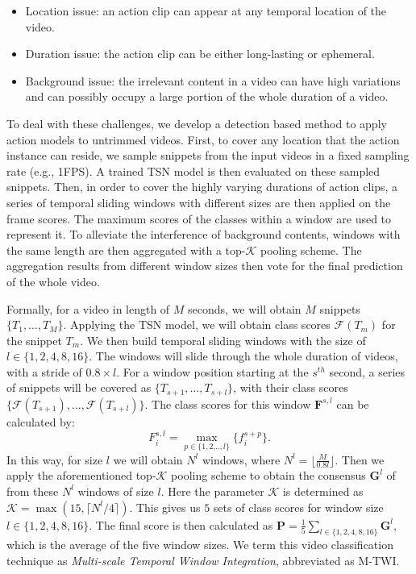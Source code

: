 \documentclass[10pt,journal,compsoc]{IEEEtran}
\begin{document}
\begin{itemize}
	\item Location issue: an action clip can appear at any temporal location of the video.
	\item Duration issue: the action clip can be either long-lasting or ephemeral.
	\item Background issue: the irrelevant content in a video can have high variations and can possibly occupy a large portion of the whole duration of a video.
\end{itemize}

To deal with these challenges, we develop a detection based method to apply action models to untrimmed videos. First, to cover any location that the action instance can reside, we sample snippets from the input videos in a fixed sampling rate (e.g., 1FPS).
A trained TSN model is then evaluated on these sampled snippets. 
Then, in order to cover the highly varying durations of action clips, a series of temporal sliding windows with different sizes are then applied on the frame scores.
The maximum scores of the classes within a window are used to represent it. 
To alleviate the interference of background contents, windows with the same length are then aggregated with a top-$ \mathcal{K} $ pooling scheme.
The aggregation results from different window sizes then vote for the final prediction of the whole video.

Formally, for a video in length of $ M $ seconds, we will obtain $ M $ snippets $ \{T_1, \ldots, T_M\} $. Applying the TSN model, we will obtain class scores $ \mathcal{F}(T_m) $ for the snippet $ T_m $.
We then build temporal sliding windows with the size of $ l \in \{1, 2, 4, 8, 16\} $. 
The windows will slide through the whole duration of videos, with a stride of $ 0.8 \times l $.
For a window position starting at the $s^{th}$ second, a series of snippets will be covered as $ \{T_{s+1}, \ldots, T_{s+l}\} $, with their class scores $ \{ \mathcal{F}(T_{s+1}), \ldots, \mathcal{F}(T_{s+l}) \}$.
The class scores for this window $ \mathbf{F}^{s,l} $ can be calculated by: 
\begin{equation}
	F^{s,l}_{i} = \max_{p \in \{1, 2 \ldots, l\}}\{f_i^{s+p}\}.
\end{equation}
In this way, for size $ l $ we will obtain $ N^l $ windows, where $ N^l = \lfloor\frac{M}{0.8l}\rfloor $.
Then we apply the aforementioned top-$ \mathcal{K} $ pooling scheme to obtain the consensus $ \mathbf{G}^l $ of from these $N^l$ windows of size $ l $.
Here the parameter $ \mathcal{K} $ is determined as $ \mathcal{K} = \max(15, \lceil N^l/4 \rceil ) $.
This gives us $ 5 $ sets of class scores for window size $ l \in \{1, 2, 4, 8, 16\} $. 
The final score is then calculated as
$ \mathbf{P} = \frac{1}{5} \sum_{l \in \{1,2,4,8,16\}}  \mathbf{G}^l$, which is the average of the five window sizes.
We term this video classification technique as \emph{Multi-scale Temporal Window Integration}, abbreviated as M-TWI.
\end{document}
